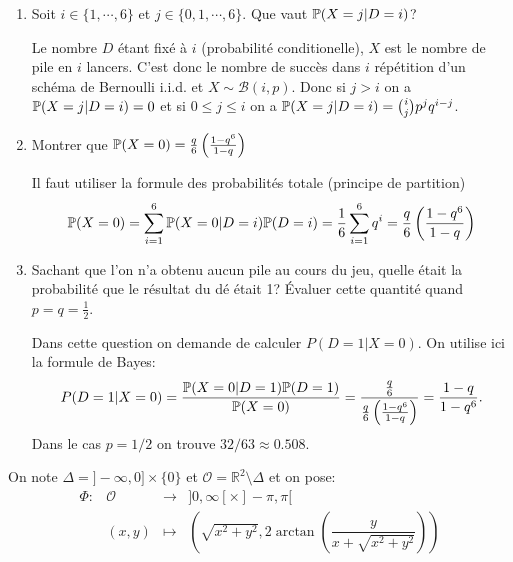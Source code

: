 \documentclass[a4paper]{tp_um}
\begin{document}
\begin{enumerate}
    \item  Soit  $i\in \{ 1 ,\cdots, 6 \}$ et $j\in \{ 0,1 ,\cdots, 6 \}$.   Que  vaut $\P ( X = j | D = i)$?

        \medskip

        Le nombre $D$ étant fixé à $i$ (probabilité conditionelle), $X$ est le nombre de pile en $i$ lancers. C'est donc le nombre de succès dans $i$ répétition d'un schéma de Bernoulli i.i.d. et  $X \sim \mathcal B(i,p)$. Donc si $j > i$ on a $\P(X= j | D=i) = 0$ et si $0\leq j \leq i$ on a $\P(X=j|D=i) = \binom{i}{j} p^j q^{i-j}$.

        \medskip

    \item Montrer que $\P(X=0) = \frac q 6 \left( \frac{1-q^6}{1-q} \right) $

        \medskip

        Il faut utiliser la formule des probabilités totale (principe de partition)
        \[
            \P(X=0) = \sum_{i=1}^{6} \P(X=0 |D=i) \P(D=i) = \frac 1 6 \sum_{i=1}^6 q^i = \frac q 6 \left( \frac{1-q^6}{1-q} \right)
        \]

        \medskip


    \item Sachant que l'on n'a obtenu aucun pile au cours du jeu, quelle était la probabilité que le résultat du dé était 1?  Évaluer cette quantité quand $ p = q =\frac 1 2$.

        \medskip
        Dans cette question on demande de calculer $P(D = 1|X = 0)$. On utilise ici la formule de Bayes:
        \[
            P(D = 1|X = 0) = \frac{\P(X = 0| D=1) \P(D = 1)}{\P(X=0)} = \frac{\frac q 6}{\frac q 6 \left(\frac{1-q^6}{1-q} \right)} = \frac{1 -q}{1-q^6}.
        \]
        Dans le cas $p=1/2$ on trouve $32/63 \approx 0.508$.
        \medskip

\end{enumerate}

\bigskip


\exo{}
On note $\Delta = ]-\infty,0]\times \{0\}$ et $\mathcal O = \mathbb R^2 \setminus \Delta$
et on pose: 
\[
\begin{array}{rrcl}
\Phi : & \mathcal O  & \longrightarrow & ]0,\infty[ \times ]-\pi,\pi[  \\
		& (x,y) & \longmapsto & \left( \sqrt{x^2+y^2}, 2 \arctan\left( \dfrac{y}{x+ \sqrt{x^2+y^2} }\right) \right)
\end{array}
\]
\end{document}

